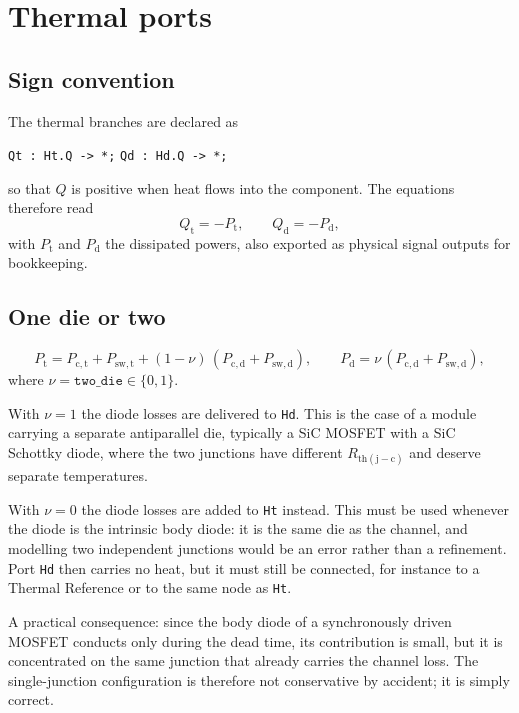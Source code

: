 \documentclass[11pt,a4paper]{article}
\begin{document}
\section{Thermal ports}

\subsection{Sign convention}

The thermal branches are declared as
\begin{center}
\texttt{Qt : Ht.Q -> *;} \qquad \texttt{Qd : Hd.Q -> *;}
\end{center}
so that $Q$ is positive when heat flows into the component. The equations
therefore read
\begin{equation}
  Q_\mathrm{t} = -P_\mathrm{t},
  \qquad
  Q_\mathrm{d} = -P_\mathrm{d},
\end{equation}
with $P_\mathrm{t}$ and $P_\mathrm{d}$ the dissipated powers, also exported as
physical signal outputs for bookkeeping.

\subsection{One die or two}

\begin{equation}
  P_\mathrm{t} = P_\mathrm{c,t} + P_\mathrm{sw,t}
                 + (1 - \nu)\,(P_\mathrm{c,d} + P_\mathrm{sw,d}),
  \qquad
  P_\mathrm{d} = \nu\,(P_\mathrm{c,d} + P_\mathrm{sw,d}),
\end{equation}
where $\nu = \texttt{two\_die} \in \{0,1\}$.

With $\nu = 1$ the diode losses are delivered to \texttt{Hd}. This is the case of
a module carrying a separate antiparallel die, typically a SiC MOSFET with a SiC
Schottky diode, where the two junctions have different $R_\mathrm{th(j-c)}$ and
deserve separate temperatures.

With $\nu = 0$ the diode losses are added to \texttt{Ht} instead. This must be
used whenever the diode is the intrinsic body diode: it is the same die as the
channel, and modelling two independent junctions would be an error rather than a
refinement. Port \texttt{Hd} then carries no heat, but it must still be
connected, for instance to a Thermal Reference or to the same node as
\texttt{Ht}.

A practical consequence: since the body diode of a synchronously driven MOSFET
conducts only during the dead time, its contribution is small, but it is
concentrated on the same junction that already carries the channel loss. The
single-junction configuration is therefore not conservative by accident; it is
simply correct.
\end{document}
